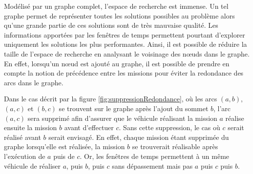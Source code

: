 Modélisé par un graphe complet, l'espace de recherche est immense. Un tel graphe permet de représenter toutes les solutions possibles au problème alors qu'une grande partie de ces solutions sont de très mauvaise qualité. Les informations apportées par les fenêtres de temps permettent pourtant d'explorer uniquement les solutions les plus performantes. 
Ainsi, il est possible de réduire la taille de l'espace de recherche en analysant le voisinage des n\oe{}uds dans le graphe. 
En effet, lorsqu'un n\oe{}ud est ajouté au graphe, il est possible de prendre en compte la notion de précédence entre les missions pour éviter la redondance des arcs dans le graphe.

Dans le cas décrit par la figure \ref{fig:suppressionRedondance}, où les arcs $(a,b)$, $(a,c)$ et $(b,c)$ se trouvent sur le graphe après l'ajout du sommet $b$, l'arc $(a,c)$ sera supprimé afin d'assurer que le véhicule réalisant la mission $a$ réalise ensuite la mission $b$ avant d'effectuer $c$. Sans cette suppression, le cas où $c$ serait réalisé avant $b$ serait envisagé. En effet, chaque mission étant supprimée du graphe lorsqu'elle est réalisée, la mission $b$ se trouverait réalisable après l'exécution de $a$ puis de $c$. Or, les fenêtres de temps permettent à un même véhicule de réaliser $a$, puis $b$, puis $c$ sans dépassement mais pas $a$ puis $c$ puis $b$.

